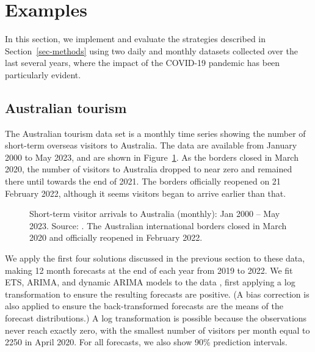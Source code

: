 \documentclass[
  11pt,
  a4paper,
]{article}
\begin{document}
\section{Examples}\label{sec-examples}

In this section, we implement and evaluate the strategies described in
Section~\ref{sec-methods} using two daily and monthly datasets collected
over the last several years, where the impact of the COVID-19 pandemic
has been particularly evident.

\subsection{Australian tourism}\label{sec-tourism}

The Australian tourism data set is a monthly time series showing the
number of short-term overseas visitors to Australia. The data
\autocite{tourismdata} are available from January 2000 to May 2023, and
are shown in Figure~\ref{fig-tourism-plot1}. As the borders closed in
March 2020, the number of visitors to Australia dropped to near zero and
remained there until towards the end of 2021. The borders officially
reopened on 21 February 2022, although it seems visitors began to arrive
earlier than that.

\begin{figure}


\caption{\label{fig-tourism-plot1}Short-term visitor arrivals to
Australia (monthly): Jan 2000 -- May 2023. Source:
\textcite{tourismdata}. The Australian international borders closed in
March 2020 and officially reopened in February 2022.}

\end{figure}%

We apply the first four solutions discussed in the previous section to
these data, making 12 month forecasts at the end of each year from 2019
to 2022. We fit ETS, ARIMA, and dynamic ARIMA models to the data
\autocite{fpp3}, first applying a log transformation to ensure the
resulting forecasts are positive. (A bias correction is also applied to
ensure the back-transformed forecasts are the means of the forecast
distributions.) A log transformation is possible because the
observations never reach exactly zero, with the smallest number of
visitors per month equal to 2250 in April 2020. For all forecasts, we
also show 90\% prediction intervals.
\end{document}
